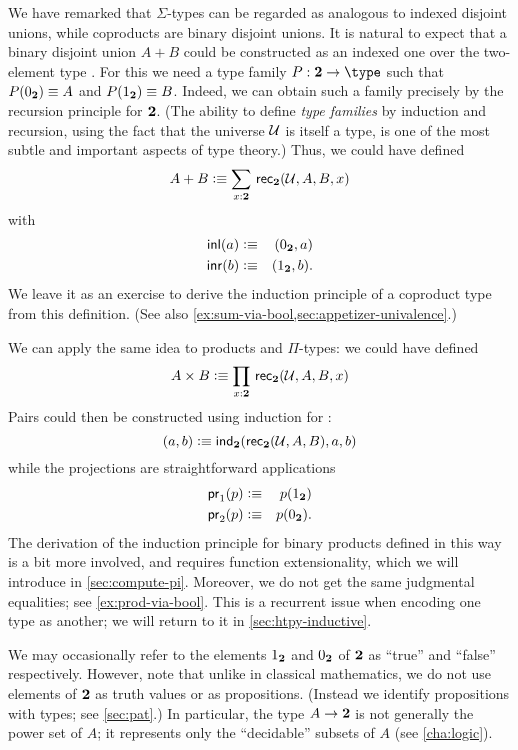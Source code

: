 We have remarked that $\Sigma$-types can be regarded as analogous to indexed disjoint unions, while coproducts are binary disjoint unions.
It is natural to expect that a binary disjoint union $A+B$ could be constructed as an indexed one over the two-element type \bool.
For this we need a type family $P:\bool\to\type$ such that $P({0_{\mathbf{2}}})\equiv A$ and $P({1_{\mathbf{2}}})\equiv B$.
Indeed, we can obtain such a family precisely by the recursion principle for $\mathbf{2}$.
%
(The ability to define \emph{type families} by induction and recursion, using the fact that the universe $\mathcal{U}$ is itself a type, is one of the most subtle and important aspects of type theory.)
Thus, we could have defined
%
\[ A + B \defeq \sm{x:\bool} \rec{\bool}(\UU,A,B,x) \]
with
\begin{eqnarray*}
  {\mathsf{inl}}(a) & \vcentcolon\equiv & ({0_{\mathbf{2}}},a) \\
  {\mathsf{inr}}(b) & \vcentcolon\equiv & ({1_{\mathbf{2}}},b).
\end{eqnarray*}
We leave it as an exercise to derive the induction principle of a coproduct type from this definition.
(See also \autoref{ex:sum-via-bool,sec:appetizer-univalence}.)

We can apply the same idea to products and $\Pi$-types: we could have defined
\[ A \times B \defeq \prd{x:\bool}\rec{\bool}(\UU,A,B,x) \]
Pairs could then be constructed using induction for \bool:
\[ (a,b) \vcentcolon\equiv \mathsf{ind}_{\mathbf{2}}(\mathsf{rec}_{\mathbf{2}}(\mathcal{U},A,B),a,b) \]
while the projections are straightforward applications
\begin{eqnarray*}
  \mathsf{pr}_{1}(p) & \vcentcolon\equiv & p({1_{\mathbf{2}}}) \\
  \mathsf{pr}_{2}(p) & \vcentcolon\equiv & p({0_{\mathbf{2}}}).
\end{eqnarray*}
The derivation of the induction principle for binary products defined in this way is a bit more involved, and requires function extensionality, which we will introduce in \autoref{sec:compute-pi}.
Moreover, we do not get the same judgmental equalities; see \autoref{ex:prod-via-bool}.
This is a recurrent issue when encoding one type as another; we will return to it in \autoref{sec:htpy-inductive}. 

We may occasionally refer to the elements ${1_{\mathbf{2}}}$ and ${0_{\mathbf{2}}}$ of $\mathbf{2}$ as ``true'' and ``false'' respectively.
However, note that unlike in classical mathematics, we do not use elements of $\mathbf{2}$ as truth values
%
or as propositions.
(Instead we identify propositions with types; see \autoref{sec:pat}.)
In particular, the type $A \to \mathbf{2}$ is not generally the power set of $A$; it represents only the ``decidable'' subsets of $A$ (see \autoref{cha:logic}).
%

